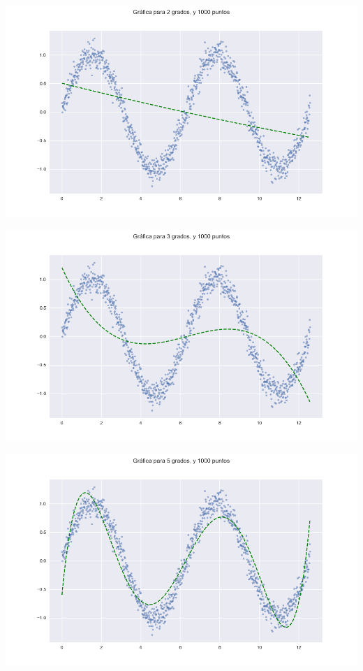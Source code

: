\documentclass{article}
\begin{document}
\begin{enumerate}
\begin{itemize}
\begin{center}
            \includegraphics[width=\textwidth]{Ajuste21000.png}
        
            \includegraphics[width=\textwidth]{Ajuste31000.png}
       
            \includegraphics[width=\textwidth]{Ajuste51000.png}
        

\end{center}
\end{itemize}
\end{enumerate}
\end{document}
